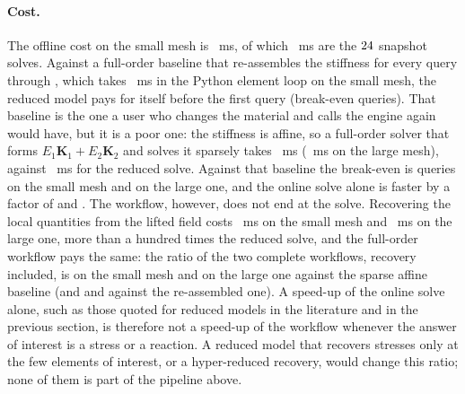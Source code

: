\paragraph{Cost.}
The offline cost on the small mesh is \cplSOff~ms, of which \cplSOffSnap~ms are the $24$ snapshot solves. Against a full-order baseline that re-assembles the stiffness for every query through , which takes \cplSTFomreasm~ms in the Python element loop on the small mesh, the reduced model pays for itself before the first query (break-even \cplSBeReasm{} queries). That baseline is the one a user who changes the material and calls the engine again would have, but it is a poor one: the stiffness is affine, so a full-order solver that forms $E_1\bm K_1+E_2\bm K_2$ and solves it sparsely takes \cplSTFomsparse~ms (\cplLTFomsparse~ms on the large mesh), against \cplSTRom~ms for the reduced solve. Against that baseline the break-even is \cplSBeSparse{} queries on the small mesh and \cplLBeSparse{} on the large one, and the online solve alone is faster by a factor of \cplSSpeedSparse{} and \cplLSpeedSparse. The workflow, however, does not end at the solve. Recovering the local quantities from the lifted field costs \cplSTRecover~ms on the small mesh and \cplLTRecover~ms on the large one, more than a hundred times the reduced solve, and the full-order workflow pays the same: the ratio of the two complete workflows, recovery included, is \cplSSpeedFlowSparse{} on the small mesh and \cplLSpeedFlowSparse{} on the large one against the sparse affine baseline (and \cplSSpeedFlowReasm{} and \cplLSpeedFlowReasm{} against the re-assembled one). A speed-up of the online solve alone, such as those quoted for reduced models in the literature and in the previous section, is therefore not a speed-up of the workflow whenever the answer of interest is a stress or a reaction. A reduced model that recovers stresses only at the few elements of interest, or a hyper-reduced recovery, would change this ratio; none of them is part of the pipeline above.

